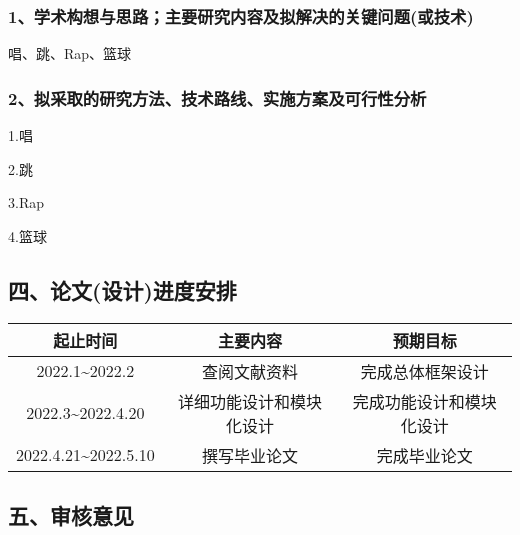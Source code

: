 \documentclass[UTF8,zihao=-4]{oucart}
\begin{document}
\begin{framed}


\subsubsection*{1、学术构想与思路；主要研究内容及拟解决的关键问题(或技术)}

唱、跳、Rap、篮球

\subsubsection*{2、拟采取的研究方法、技术路线、实施方案及可行性分析}

1.唱

2.跳

3.Rap

4.篮球
\end{framed}

\newpage

\subsection*{四、论文(设计)进度安排}

\noindent
\begin{tabular}{|c|c|c|}
	\hline
	起止时间 & 主要内容 & 预期目标 \\
	\hline
	2022.1\~{}2022.2	 		&  查阅文献资料    			&  完成总体框架设计    \\
	\hline
	2022.3\~{}2022.4.20	 	&  详细功能设计和模块化设计   	&  完成功能设计和模块化设计    \\
	\hline
	2022.4.21\~{}2022.5.10	 	&  撰写毕业论文    			& 完成毕业论文 \\
	\hline
\end{tabular}

\subsection*{五、审核意见}

\begin{framed}
	\vspace{50mm}
    \begin{flushright}
		\makebox[35mm]{}\par
		\makebox[10mm]{}\makebox[10mm]{}\makebox[10mm]{}\makebox[10mm]{}\par
	\end{flushright}
\end{framed}

\setlength{\parskip}{0pt}

\begin{framed}
	\vspace{50mm}
    \begin{flushright}
		\uline{\makebox[25mm]{}}\makebox[10mm]{}\par
		\makebox[10mm]{}\makebox[10mm]{}\makebox[10mm]{}\makebox[10mm]{}\par
	\end{flushright}
\end{framed}
\end{document}
